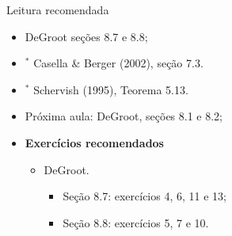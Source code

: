 \begin{frame}{Leitura recomendada}
\begin{itemize}
 \item[\faBook] DeGroot seções 8.7 e 8.8;
 \item[\faBook] $^\ast$ Casella \& Berger (2002), seção 7.3.
 \item[\faBook] $^\ast$ Schervish (1995), Teorema  5.13.
 \item[\faForward] Próxima aula: DeGroot, seções 8.1 e 8.2;
 \item {\large\textbf{Exercícios recomendados}}
 \begin{itemize}
  \item[\faBookmark] DeGroot.
  \begin{itemize}
   \item Seção 8.7: exercícios 4, 6, 11 e 13;
   \item Seção 8.8: exercícios 5, 7 e 10.
  \end{itemize}   
  \end{itemize}
 \end{itemize} 
\end{frame}

